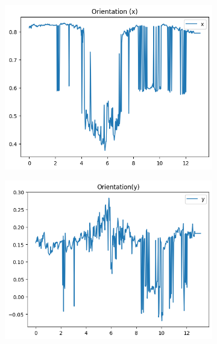 \begin{figure}
    \centering
    \begin{subfigure}[b]{0.49\textwidth}
         \centering
         \includegraphics[width=\textwidth]{images/orientation_x_figure.png}
    \end{subfigure}
    \hfill
    \begin{subfigure}[b]{0.49\textwidth}
         \centering
         \includegraphics[width=\textwidth]{images/orientation_y_figure.png}
    \end{subfigure}
    \hfill
    \begin{subfigure}[b]{0.49\textwidth}
         \centering

\end{subfigure}
\end{figure}
